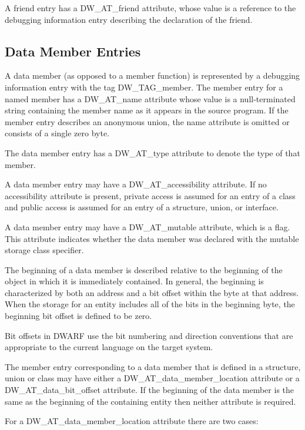 A friend entry has a DW\_AT\_friend attribute, whose value is
a reference to the debugging information entry describing
the declaration of the friend.


\subsection{Data Member Entries}
\label{chap:datamemberentries}

A data member (as opposed to a member function) is
represented by a debugging information entry with the tag
DW\_TAG\_member. The member entry for a named member has
a DW\_AT\_name attribute whose value is a null-terminated
string containing the member name as it appears in the source
program. If the member entry describes an anonymous union, the
name attribute is omitted or consists of a single zero byte.

The data member entry has a DW\_AT\_type attribute to denote
the type of that member.

A data member entry may have a DW\_AT\_accessibility
attribute. If no accessibility attribute is present, private
access is assumed for an entry of a class and public access
is assumed for an entry of a structure, union, or interface.

A data member entry may have a DW\_AT\_mutable attribute,
which is a flag. This attribute indicates whether the data
member was declared with the mutable storage class specifier.

The beginning of a data member is described relative to
the beginning of the object in which it is immediately
contained. In general, the beginning is characterized by
both an address and a bit offset within the byte at that
address. When the storage for an entity includes all of
the bits in the beginning byte, the beginning bit offset is
defined to be zero.

Bit offsets in DWARF use the bit numbering and direction
conventions that are appropriate to the current language on
the target system.

The member entry corresponding to a data member that is
defined in a structure, union or class may have either a
DW\_AT\_data\_member\_location attribute or a DW\_AT\_data\_bit\_offset
attribute. If the beginning of the data member is the same as
the beginning of the containing entity then neither attribute
is required.

For a DW\_AT\_data\_member\_location attribute there are two cases:


